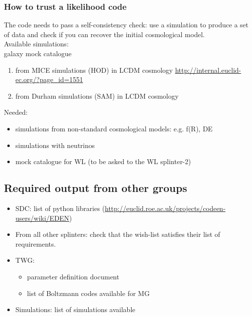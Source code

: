 \subsubsection{How to trust a likelihood code}
The code needs to pass a self-consistency check: use a simulation to produce a set of data and check if you can recover the initial cosmological model.\\
Available simulations: \\
galaxy mock catalogue
\begin{enumerate}
 \item from MICE simulations (HOD) in LCDM cosmology  \url{http://internal.euclid-ec.org/?page_id=1551}
 \item from Durham simulations (SAM) in LCDM cosmology 
\end{enumerate}
Needed:
\begin{itemize}
 \item simulations from non-standard cosmological models: e.g. f(R), DE 
 \item simulations with neutrinos
 \item mock catalogue for WL (to be asked to the WL splinter-2)
\end{itemize}


\subsection{Required output from other groups}
\begin{itemize}
 \item SDC: list of python libraries (\url{http://euclid.roe.ac.uk/projects/codeen-users/wiki/EDEN}) 
 \item From all other splinters: check that the wish-list satisfies their list of requirements. 
 \item TWG:
 \begin{itemize}
  \item parameter definition document
  \item list of Boltzmann codes available for MG
 \end{itemize}
 \item Simulations: list of simulations available
\end{itemize}

